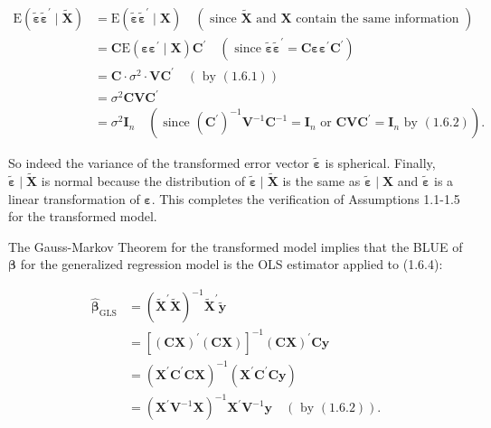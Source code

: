\documentclass[10pt]{article}
\begin{document}
$$
\begin{aligned}
\mathrm{E}\left(\tilde{\boldsymbol{\varepsilon}} \tilde{\boldsymbol{\varepsilon}}^{\prime} \mid \widetilde{\mathbf{X}}\right) & =\mathrm{E}\left(\tilde{\boldsymbol{\varepsilon}} \tilde{\boldsymbol{\varepsilon}}^{\prime} \mid \mathbf{X}\right) \quad(\text { since } \tilde{\mathbf{X}} \text { and } \mathbf{X} \text { contain the same information }) \\
& =\mathbf{C} \mathrm{E}\left(\boldsymbol{\varepsilon} \boldsymbol{\varepsilon}^{\prime} \mid \mathbf{X}\right) \mathbf{C}^{\prime} \quad\left(\text { since } \tilde{\boldsymbol{\varepsilon}} \tilde{\boldsymbol{\varepsilon}}^{\prime}=\mathbf{C} \boldsymbol{\varepsilon} \boldsymbol{\varepsilon}^{\prime} \mathbf{C}^{\prime}\right) \\
& =\mathbf{C} \cdot \sigma^{2} \cdot \mathbf{V} \mathbf{C}^{\prime} \quad(\text { by }(1.6 .1)) \\
& =\sigma^{2} \mathbf{C} \mathbf{V} \mathbf{C}^{\prime} \\
& =\sigma^{2} \mathbf{I}_{n} \quad\left(\text { since }\left(\mathbf{C}^{\prime}\right)^{-1} \mathbf{V}^{-1} \mathbf{C}^{-1}=\mathbf{I}_{n} \text { or } \mathbf{C} \mathbf{V C ^ { \prime }}=\mathbf{I}_{n} \text { by }(1.6 .2)\right) .
\end{aligned}
$$

So indeed the variance of the transformed error vector $\tilde{\boldsymbol{\varepsilon}}$ is spherical. Finally, $\tilde{\boldsymbol{\varepsilon}} \mid \widetilde{\mathbf{X}}$ is normal because the distribution of $\tilde{\boldsymbol{\varepsilon}} \mid \tilde{\mathbf{X}}$ is the same as $\tilde{\boldsymbol{\varepsilon}} \mid \mathbf{X}$ and $\tilde{\boldsymbol{\varepsilon}}$ is a linear transformation of $\boldsymbol{\varepsilon}$. This completes the verification of Assumptions 1.1-1.5 for the transformed model.

The Gauss-Markov Theorem for the transformed model implies that the BLUE of $\boldsymbol{\beta}$ for the generalized regression model is the OLS estimator applied to (1.6.4):


\begin{align*}
\widehat{\boldsymbol{\beta}}_{\mathrm{GLS}} & =\left(\tilde{\mathbf{X}}^{\prime} \tilde{\mathbf{X}}\right)^{-1} \tilde{\mathbf{X}}^{\prime} \tilde{\mathbf{y}} \\
& =\left[(\mathbf{C X})^{\prime}(\mathbf{C X})\right]^{-1}(\mathbf{C X})^{\prime} \mathbf{C y} \\
& =\left(\mathbf{X}^{\prime} \mathbf{C}^{\prime} \mathbf{C X}\right)^{-1}\left(\mathbf{X}^{\prime} \mathbf{C}^{\prime} \mathbf{C y}\right) \\
& =\left(\mathbf{X}^{\prime} \mathbf{V}^{-1} \mathbf{X}\right)^{-1} \mathbf{X}^{\prime} \mathbf{V}^{-1} \mathbf{y} \quad(\text { by }(1.6 .2)) . \tag{1.6.5}
\end{align*}
\end{document}
